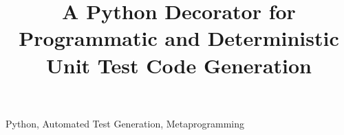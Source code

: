 \documentclass[10pt, conference]{IEEEtran}
\begin{document}
\title{A Python Decorator for Programmatic and Deterministic Unit Test Code Generation\\}

\author{
}
\maketitle



\begin{IEEEkeywords}
Python, Automated Test Generation, Metaprogramming
\end{IEEEkeywords}








\newpage



\end{document}
